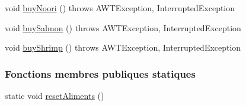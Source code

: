 \begin{DoxyCompactItemize}
\item 
void \hyperlink{classTestSushi_1_1src_1_1Suchi_1_1Recette_a5602befaaef8858b75c131e50f7cf91d}{buy\+Noori} ()  throws A\+W\+T\+Exception, Interrupted\+Exception
\item 
void \hyperlink{classTestSushi_1_1src_1_1Suchi_1_1Recette_a64cf6254490e04e9e8031d564a4a0ea3}{buy\+Salmon} ()  throws A\+W\+T\+Exception, Interrupted\+Exception
\item 
void \hyperlink{classTestSushi_1_1src_1_1Suchi_1_1Recette_a0d15202c729b3c6b2bb699de4137d551}{buy\+Shrimp} ()  throws A\+W\+T\+Exception, Interrupted\+Exception
\end{DoxyCompactItemize}
\subsubsection*{Fonctions membres publiques statiques}
\begin{DoxyCompactItemize}
\item 
static void \hyperlink{classTestSushi_1_1src_1_1Suchi_1_1Recette_aef7faa1aea5f8aeb869c612af16e4e62}{reset\+Aliments} ()
\end{DoxyCompactItemize}
